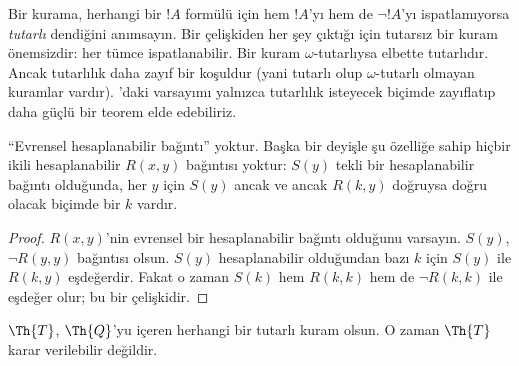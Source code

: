 



\begin{explain}
Bir kurama, herhangi bir $!A$ formülü için hem $!A$'yı hem de
$\lnot !A$'yı ispatlamıyorsa \emph{tutarlı} dendiğini anımsayın. Bir
çelişkiden her şey çıktığı için tutarsız bir kuram önemsizdir: her tümce
ispatlanabilir. Bir kuram $\omega$-tutarlıysa elbette tutarlıdır. Ancak
tutarlılık daha zayıf bir koşuldur (yani tutarlı olup $\omega$-tutarlı
olmayan kuramlar vardır). 'daki varsayımı yalnızca
tutarlılık isteyecek biçimde zayıflatıp daha güçlü bir teorem elde
edebiliriz.
\end{explain}

\begin{lem}
“Evrensel hesaplanabilir bağıntı” yoktur. Başka bir deyişle şu özelliğe
sahip hiçbir ikili hesaplanabilir $R(x,y)$ bağıntısı yoktur: $S(y)$ tekli
bir hesaplanabilir bağıntı olduğunda, her $y$ için $S(y)$ ancak ve ancak
$R(k,y)$ doğruysa doğru olacak biçimde bir $k$ vardır.
\end{lem}

\begin{proof}
$R(x,y)$'nin evrensel bir hesaplanabilir bağıntı olduğunu varsayın. $S(y)$,
$\lnot R(y,y)$ bağıntısı olsun. $S(y)$ hesaplanabilir olduğundan bazı $k$
için $S(y)$ ile $R(k,y)$ eşdeğerdir. Fakat o zaman $S(k)$ hem $R(k,k)$ hem
de $\lnot R(k,k)$ ile eşdeğer olur; bu bir çelişkidir.
\end{proof}


\begin{thm}
$\Th{T}$, $\Th{Q}$'yu içeren herhangi bir tutarlı kuram olsun. O zaman
$\Th{T}$ karar verilebilir değildir.
\end{thm}



